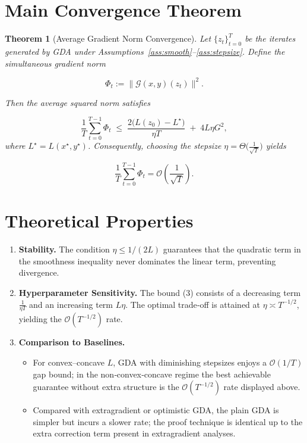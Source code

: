 \documentclass{article}
\newtheorem{theorem}{Theorem}
\newcommand{\G}{\mathcal{G}(x,y)}
\begin{document}
\section*{Main Convergence Theorem}
\begin{theorem}[Average Gradient Norm Convergence]\label{thm:main}
Let \(\{z_t\}_{t=0}^{T}\) be the iterates generated by GDA under Assumptions~\ref{ass:smooth}–\ref{ass:stepsize}. Define the \emph{simultaneous gradient norm}  

\[
\Phi_t:=\|\G(z_t)\|^2.
\]

Then the average squared norm satisfies  

\[
\frac1T\sum_{t=0}^{T-1}\Phi_t
\;\le\;
\frac{2\big(L(z_0)-L^{\star}\big)}{\eta T}
\;+\;
4L\eta G^2,
\tag{3}
\]
where \(L^{\star}=L(x^{\star},y^{\star})\). Consequently, choosing the stepsize \(\eta=\Theta\big(\tfrac{1}{\sqrt{T}}\big)\) yields  

\[
\frac1T\sum_{t=0}^{T-1}\Phi_t =\mathcal{O}\!\left(\frac{1}{\sqrt{T}}\right).
\]
\end{theorem}

\section*{Theoretical Properties}
\begin{enumerate}[label=\arabic*.]
\item \textbf{Stability.} The condition \(\eta\le 1/(2L)\) guarantees that the quadratic term in the smoothness inequality never dominates the linear term, preventing divergence.
\item \textbf{Hyperparameter Sensitivity.} The bound (3) consists of a decreasing term \(\frac{1}{\eta T}\) and an increasing term \(L\eta\). The optimal trade‑off is attained at \(\eta\asymp T^{-1/2}\), yielding the \(\mathcal{O}(T^{-1/2})\) rate.
\item \textbf{Comparison to Baselines.}
\begin{itemize}
\item For convex–concave \(L\), GDA with diminishing stepsizes enjoys a \(\mathcal{O}(1/T)\) gap bound; in the non‑convex‑concave regime the best achievable guarantee without extra structure is the \(\mathcal{O}(T^{-1/2})\) rate displayed above.
\item Compared with extragradient or optimistic GDA, the plain GDA is simpler but incurs a slower rate; the proof technique is identical up to the extra correction term present in extragradient analyses.
\end{itemize}
\end{enumerate}
\end{document}
